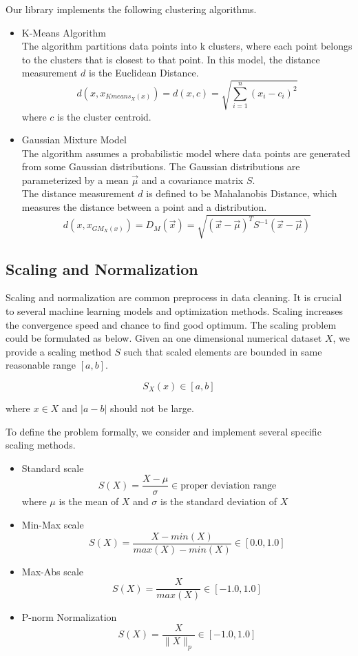 \documentclass[sigconf]{acmart}
\begin{document}
Our library implements the following clustering algorithms. 
\begin{itemize}
	\item{K-Means Algorithm} \\
		The algorithm partitions data points into k clusters, where each point belongs to the clusters that is closest to that point. In this model, the distance measurement $d$ is the Euclidean Distance.
		\[ d( x, x_{Kmeans_X(x)}) = d( x, c) = \sqrt{\sum_{i=1}^n{(x_i - c_i ) ^ 2} } \]
		where $c$ is the cluster centroid.
	\item{Gaussian Mixture Model} \\
		The algorithm assumes a probabilistic model where data points are generated from some Gaussian distributions. The Gaussian distributions are parameterized by a mean $\vec{\mu}$ and a covariance matrix $S$. \\
		The distance measurement $d$ is defined to be Mahalanobis Distance, which measures the distance between a point and a distribution.
		\[ d( x, x_{GM_X(x)}) = D_M(\vec{x}) = \sqrt{(\vec{x}-\vec{\mu})^T S^{-1} (\vec{x}-\vec{\mu}) } \]
\end{itemize}

\subsection{Scaling and Normalization}
Scaling and normalization are common preprocess in data cleaning. It is crucial to several machine learning models and optimization methods. Scaling increases the convergence speed and chance to find good optimum\cite{convex}. The scaling problem could be formulated as below.
Given an one dimensional numerical dataset $X$, we provide a scaling method $S$ such that scaled elements are bounded in same reasonable range $[a, b]$.

\[ S_X(x) \in [a, b]\] 

where $x \in X$ and $|a - b|$ should not be large.

To define the problem formally, we consider and implement several specific scaling methods.
\begin{itemize}
	\item{Standard scale}
		\[ S(X) = \dfrac{X-\mu}{\sigma} \in \text{proper deviation range}\]
		where $\mu$ is the mean of $X$ and $\sigma$ is the standard deviation of $X$
	\item{Min-Max scale}
		\[ S(X) = \dfrac{X-min(X)}{max(X) - min(X)}\in [0.0, 1.0] \]
	\item{Max-Abs scale}
		\[ S(X) = \dfrac{X}{max(X)} \in [-1.0, 1.0] \]
	\item{P-norm Normalization}
		\[ S(X) = \dfrac{X}{\|X\|_{p}} \in [-1.0, 1.0]\]
\end{itemize}
\end{document}
